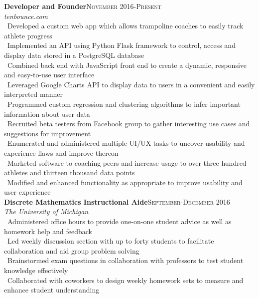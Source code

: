 \documentclass[a4paper,10pt]{article}
\renewcommand{\subsection}[2]{{\noindent \textbf{#1}\hfill \textsc{#2}\\}}
\begin{document}
\subsection{Developer and Founder}{November 2016-Present}
\textit{tenbounce.com}\\
\textbullet\ Developed a custom web app which allows trampoline coaches to easily track athlete progress\\
\textbullet\ Implemented an API using Python Flask framework to control, access and display data stored in a PostgreSQL database\\
\textbullet\ Combined back end with JavaScript front end to create a dynamic, responsive and easy-to-use user interface\\
\textbullet\ Leveraged Google Charts API to display data to users in a convenient and easily interpreted manner\\
\textbullet\ Programmed custom regression and clustering algorithms to infer important information about user data\\
\textbullet\ Recruited beta testers from Facebook group to gather interesting use cases and suggestions for improvement\\
\textbullet\ Enumerated and administered multiple UI/UX tasks to uncover usability and experience flaws and improve thereon\\
\textbullet\ Marketed software to coaching peers and increase usage to over three hundred athletes and thirteen thousand data points\\
\textbullet\ Modified and enhanced functionality as appropriate to improve usability and user experience\\

\subsection{Discrete Mathematics Instructional Aide}{September-December 2016}
\textit{The University of Michigan}\\
\textbullet\ Administered office hours to provide one-on-one student advice
 as well as homework help and feedback\\
\textbullet\ Led weekly discussion section with up to forty students to facilitate
 collaboration and aid group problem solving\\
\textbullet\ Brainstormed exam questions in collaboration with professors to test student knowledge effectively\\
\textbullet\ Collaborated with coworkers to design weekly homework sets to measure and enhance student understanding\\
\end{document}
